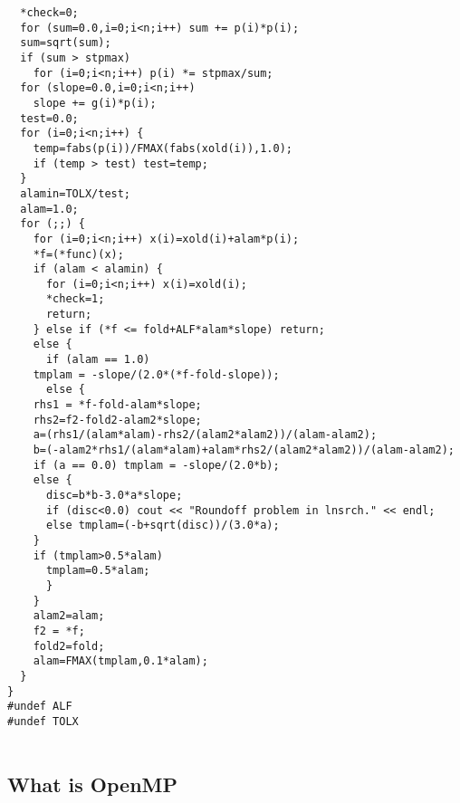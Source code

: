 \begin{verbatim}
  *check=0;
  for (sum=0.0,i=0;i<n;i++) sum += p(i)*p(i);
  sum=sqrt(sum);
  if (sum > stpmax)
    for (i=0;i<n;i++) p(i) *= stpmax/sum;
  for (slope=0.0,i=0;i<n;i++)
    slope += g(i)*p(i);
  test=0.0;
  for (i=0;i<n;i++) {
    temp=fabs(p(i))/FMAX(fabs(xold(i)),1.0);
    if (temp > test) test=temp;
  }
  alamin=TOLX/test;
  alam=1.0;
  for (;;) {
    for (i=0;i<n;i++) x(i)=xold(i)+alam*p(i);
    *f=(*func)(x);
    if (alam < alamin) {
      for (i=0;i<n;i++) x(i)=xold(i);
      *check=1;
      return;
    } else if (*f <= fold+ALF*alam*slope) return;
    else {
      if (alam == 1.0)
	tmplam = -slope/(2.0*(*f-fold-slope));
      else {
	rhs1 = *f-fold-alam*slope;
	rhs2=f2-fold2-alam2*slope;
	a=(rhs1/(alam*alam)-rhs2/(alam2*alam2))/(alam-alam2);
	b=(-alam2*rhs1/(alam*alam)+alam*rhs2/(alam2*alam2))/(alam-alam2);
	if (a == 0.0) tmplam = -slope/(2.0*b);
	else {
	  disc=b*b-3.0*a*slope;
	  if (disc<0.0) cout << "Roundoff problem in lnsrch." << endl;
	  else tmplam=(-b+sqrt(disc))/(3.0*a);
	}
	if (tmplam>0.5*alam)
	  tmplam=0.5*alam;
      }
    }
    alam2=alam;
    f2 = *f;
    fold2=fold;
    alam=FMAX(tmplam,0.1*alam);
  }
}
#undef ALF
#undef TOLX


\end{verbatim}



\subsection*{What is OpenMP}

